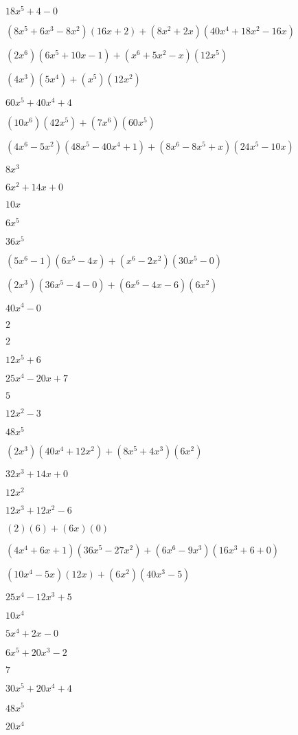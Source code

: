 \documentclass{article}
\begin{document}
\begin{multicols}{2}
$18x^{5}+4-0$\item $(8x^{5}+6x^{3}-8x^2)(16x+2)+(8x^2+2x)(40x^{4}+18x^{2}-16x)$\item $(2x^{6})(6x^{5}+10x-1)+(x^{6}+5x^2-x)(12x^{5})$\item $(4x^{3})(5x^{4})+(x^{5})(12x^{2})$\item $60x^{5}+40x^{4}+4$\item $(10x^{6})(42x^{5})+(7x^{6})(60x^{5})$\item $(4x^{6}-5x^2)(48x^{5}-40x^{4}+1)+(8x^{6}-8x^{5}+x)(24x^{5}-10x)$\item $8x^{3}$\item $6x^{2}+14x+0$\item $10x$\item $6x^{5}$\item $36x^{5}$\item $(5x^{6}-1)(6x^{5}-4x)+(x^{6}-2x^2)(30x^{5}-0)$\item $(2x^{3})(36x^{5}-4-0)+(6x^{6}-4x-6)(6x^{2})$\item $40x^{4}-0$\item $2$\item $2$\item $12x^{5}+6$\item $25x^{4}-20x+7$\item $5$\item $12x^{2}-3$\item $48x^{5}$\item $(2x^{3})(40x^{4}+12x^{2})+(8x^{5}+4x^{3})(6x^{2})$\item $32x^{3}+14x+0$\item $12x^{2}$\item $12x^{3}+12x^{2}-6$\item $(2)(6)+(6x)(0)$\item $(4x^{4}+6x+1)(36x^{5}-27x^{2})+(6x^{6}-9x^{3})(16x^{3}+6+0)$\item $(10x^{4}-5x)(12x)+(6x^2)(40x^{3}-5)$\item $25x^{4}-12x^{3}+5$\item $10x^{4}$\item $5x^{4}+2x-0$\item $6x^{5}+20x^{3}-2$\item $7$\item $30x^{5}+20x^{4}+4$\item $48x^{5}$\item $20x^{4}$\item 
\end{multicols}
\end{document}
